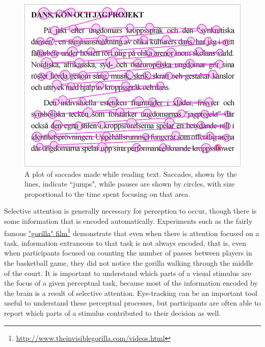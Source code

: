 \documentclass[11pt]{isuthesis}\usepackage[]{graphicx}\usepackage[]{color}
\begin{document}
\begin{figure}[htbp]
\centering
\includegraphics[width=.5\textwidth]{SaccadesText}
\caption[Saccades and Pauses]{A plot of saccades made while reading text. Saccades, shown by the lines, indicate ``jumps", while pauses are shown by circles, with size proportional to the time spent focusing on that area.}\label{fig:saccadestext}
\end{figure}

Selective attention is generally necessary for perception to occur, though there is some information that is encoded automatically. Experiments such as the fairly famous \href{http://www.theinvisiblegorilla.com/videos.html}{"gorilla" film}\footnote{\url{http://www.theinvisiblegorilla.com/videos.html}} demonstrate that even when there is attention focused on a task, information extraneous to that task is not always encoded, that is, even when participants focused on counting the number of passes between players in the basketball game, they did not notice the gorilla walking through the middle of the court. It is important to understand which parts of a visual stimulus are the focus of a given perceptual task, because most of the information encoded by the brain is a result of selective attention. Eye-tracking can be an important tool useful to understand these perceptual processes, but participants are often able to report which parts of a stimulus contributed to their decision as well.
\end{document}
